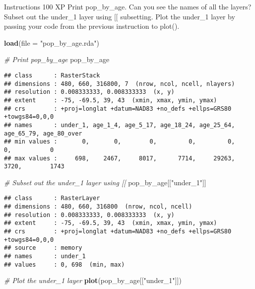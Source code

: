 \documentclass[]{article}
\newenvironment{Shaded}{\begin{snugshade}}{\end{snugshade}}
\newcommand{\CommentTok}[1]{\textcolor[rgb]{0.56,0.35,0.01}{\textit{#1}}}
\newcommand{\DataTypeTok}[1]{\textcolor[rgb]{0.13,0.29,0.53}{#1}}
\newcommand{\KeywordTok}[1]{\textcolor[rgb]{0.13,0.29,0.53}{\textbf{#1}}}
\newcommand{\NormalTok}[1]{#1}
\newcommand{\StringTok}[1]{\textcolor[rgb]{0.31,0.60,0.02}{#1}}
\begin{document}
Instructions 100 XP Print pop\_by\_age. Can you see the names of all the
layers? Subset out the under\_1 layer using {[}{[} subsetting. Plot the
under\_1 layer by passing your code from the previous instruction to
plot().

\begin{Shaded}
\begin{Highlighting}[]
\KeywordTok{load}\NormalTok{(}\DataTypeTok{file =} \StringTok{"pop_by_age.rda"}\NormalTok{)}

\CommentTok{# Print pop_by_age}
\NormalTok{pop_by_age}
\end{Highlighting}
\end{Shaded}

\begin{verbatim}
## class      : RasterStack 
## dimensions : 480, 660, 316800, 7  (nrow, ncol, ncell, nlayers)
## resolution : 0.008333333, 0.008333333  (x, y)
## extent     : -75, -69.5, 39, 43  (xmin, xmax, ymin, ymax)
## crs        : +proj=longlat +datum=NAD83 +no_defs +ellps=GRS80 +towgs84=0,0,0 
## names      : under_1, age_1_4, age_5_17, age_18_24, age_25_64, age_65_79, age_80_over 
## min values :       0,       0,        0,         0,         0,         0,           0 
## max values :     698,    2467,     8017,      7714,     29263,      3720,        1743
\end{verbatim}

\begin{Shaded}
\begin{Highlighting}[]
\CommentTok{# Subset out the under_1 layer using [[}
\NormalTok{pop_by_age[[}\StringTok{"under_1"}\NormalTok{]]}
\end{Highlighting}
\end{Shaded}

\begin{verbatim}
## class      : RasterLayer 
## dimensions : 480, 660, 316800  (nrow, ncol, ncell)
## resolution : 0.008333333, 0.008333333  (x, y)
## extent     : -75, -69.5, 39, 43  (xmin, xmax, ymin, ymax)
## crs        : +proj=longlat +datum=NAD83 +no_defs +ellps=GRS80 +towgs84=0,0,0 
## source     : memory
## names      : under_1 
## values     : 0, 698  (min, max)
\end{verbatim}

\begin{Shaded}
\begin{Highlighting}[]
\CommentTok{# Plot the under_1 layer}
\KeywordTok{plot}\NormalTok{(pop_by_age[[}\StringTok{"under_1"}\NormalTok{]])}
\end{Highlighting}
\end{Shaded}
\end{document}

